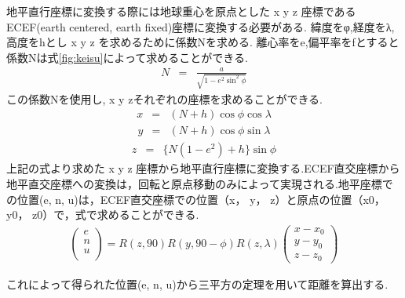 地平直行座標に変換する際には地球重心を原点とした x y z 座標であるECEF(earth centered, earth fixed)座標に変換する必要がある.
緯度をφ,経度をλ,高度をhとし x y z を求めるために係数Nを求める.
離心率をe,偏平率をfとすると係数Nは式\ref{fig:keisu}によって求めることができる.
\begin{eqnarray}
	N  & = & \frac{a}{\sqrt{1-e^2\sin^2\phi}}
	\label{fig:keisu}
\end{eqnarray}
この係数Nを使用し, x y zそれぞれの座標を求めることができる.
\begin{eqnarray}
	x  & = & (N+h)\cos\phi\cos\lambda
\end{eqnarray}
\begin{eqnarray}
	y  & = & (N+h)\cos\phi\sin\lambda
\end{eqnarray}
\begin{eqnarray}
	z  & = & \{N(1-e^2)+h\}\sin\phi
\end{eqnarray}
上記の式より求めた x y z 座標から地平直行座標に変換する.ECEF直交座標から地平直交座標への変換は，回転と原点移動のみによって実現される.地平座標での位置(e, n, u)は，ECEF直交座標での位置（x， y， z）と原点の位置（x{\scriptsize 0}， y{\scriptsize 0}， z{\scriptsize 0}）で，式で求めることができる.
\begin{eqnarray}
  \left(
    \begin{array}{c}
      e\\
      n\\
      u\\ 
    \end{array}
  \right)=R(z,90)R(y,90-\phi)R(z,\lambda)
  \begin{pmatrix}
      x-x_0\\
      y-y_0\\
      z-z_0 
    \end{pmatrix}
\end{eqnarray}

これによって得られた位置(e, n, u)から三平方の定理を用いて距離を算出する.

